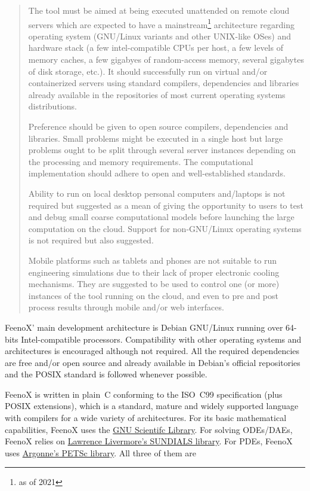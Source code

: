 \documentclass[
  american,
]{article}
\begin{document}
\begin{quote}
The tool must be aimed at being executed unattended on remote cloud
servers which are expected to have a mainstream\footnote{as of 2021}
architecture regarding operating system (GNU/Linux variants and other
UNIX-like OSes) and hardware stack (a few intel-compatible CPUs per
host, a few levels of memory caches, a few gigabyes of random-access
memory, several gigabytes of disk storage, etc.). It should successfully
run on virtual and/or containerized servers using standard compilers,
dependencies and libraries already available in the repositories of most
current operating systems distributions.

Preference should be given to open source compilers, dependencies and
libraries. Small problems might be executed in a single host but large
problems ought to be split through several server instances depending on
the processing and memory requirements. The computational implementation
should adhere to open and well-established standards.

Ability to run on local desktop personal computers and/laptops is not
required but suggested as a mean of giving the opportunity to users to
test and debug small coarse computational models before launching the
large computation on the cloud. Support for non-GNU/Linux operating
systems is not required but also suggested.

Mobile platforms such as tablets and phones are not suitable to run
engineering simulations due to their lack of proper electronic cooling
mechanisms. They are suggested to be used to control one (or more)
instances of the tool running on the cloud, and even to pre and post
process results through mobile and/or web interfaces.
\end{quote}

FeenoX' main development architecture is Debian GNU/Linux running over
64-bits Intel-compatible processors. Compatibility with other operating
systems and architectures is encouraged although not required. All the
required dependencies are free and/or open source and already available
in Debian's official repositories and the POSIX standard is followed
whenever possible.

FeenoX is written in plain~C conforming to the ISO~C99 specification
(plus POSIX extensions), which is a standard, mature and widely
supported language with compilers for a wide variety of architectures.
For its basic mathematical capabilities, FeenoX uses the
\href{https://www.gnu.org/software/gsl/}{GNU Scientifc Library}. For
solving ODEs/DAEs, FeenoX relies on
\href{https://computing.llnl.gov/projects/sundials/ida}{Lawrence
Livermore's SUNDIALS library}. For PDEs, FeenoX uses
\href{https://www.mcs.anl.gov/petsc/}{Argonne's PETSc library}. All
three of them are
\end{document}

